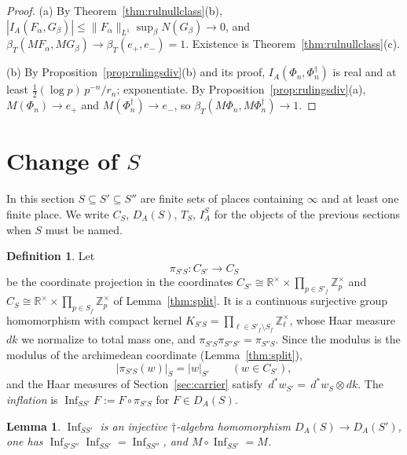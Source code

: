 \documentclass[11pt]{amsart}
\newtheorem{lemma}[theorem]{Lemma}
\theoremstyle{definition}
\newtheorem{definition}[theorem]{Definition}
\theoremstyle{remark}
\newcommand{\R}{\mathbb R}
\newcommand{\Z}{\mathbb Z}
\newcommand{\dstar}{\,d^{*}}
\newcommand{\Inf}{\operatorname{Inf}}
\newcommand{\DA}{D_A}
\begin{document}
\begin{proof}
(a)  By Theorem~\ref{thm:rulnullclass}(b),
$|I_A(F_{\alpha},G_{\beta})|\le\lVert F_{\alpha}\rVert_{L^{1}}
\sup_{\beta}N(G_{\beta})\to0$, and
$\beta_T(MF_{\alpha},MG_{\beta})\to\beta_T(e_+,e_-)=1$.  Existence is
Theorem~\ref{thm:rulnullclass}(c).

(b)  By Proposition~\ref{prop:rulingsdiv}(b) and its proof,
$I_A(\Phi_n,\Phi_n^{\dagger})$ is real and at least
$\tfrac12(\log p)\,p^{-n}/r_n$; exponentiate.  By
Proposition~\ref{prop:rulingsdiv}(a), $M(\Phi_n)\to e_+$ and
$M(\Phi_n^{\dagger})\to e_-$, so $\beta_T(M\Phi_n,M\Phi_n^{\dagger})\to1$.
\end{proof}

\section{Change of \texorpdfstring{$S$}{S}}\label{sec:charts}

In this section $S\subseteq S'\subseteq S''$ are finite sets of places
containing $\infty$ and at least one finite place.  We write $C_S$, $\DA(S)$,
$T_S$, $I_A^{S}$ for the objects of the previous sections when $S$ must be
named.

\begin{definition}\label{def:chartsystem}
Let
\begin{equation}\label{eq:piTS}
\pi_{S'S}:C_{S'}\longrightarrow C_S
\end{equation}
be the coordinate projection in the coordinates
$C_{S'}\cong\R^{\times}\times\prod_{p\in S'_f}\Z_p^{\times}$ and
$C_S\cong\R^{\times}\times\prod_{p\in S_f}\Z_p^{\times}$ of
Lemma~\ref{thm:split}.  It is a continuous surjective group homomorphism with
compact kernel $K_{S'S}=\prod_{\ell\in S'_f\setminus S_f}\Z_{\ell}^{\times}$,
whose Haar measure $dk$ we normalize to total mass one, and
$\pi_{S'S}\pi_{S''S'}=\pi_{S''S}$.  Since the modulus is the modulus of the
archimedean coordinate (Lemma~\ref{thm:split}),
\begin{equation}\label{eq:chartsystem}
|\pi_{S'S}(w)|_S=|w|_{S'}\qquad(w\in C_{S'}),
\end{equation}
and the Haar measures of Section~\ref{sec:carrier} satisfy
$\dstar w_{S'}=\dstar w_S\otimes dk$.  The \emph{inflation} is
$\Inf_{SS'}F:=F\circ\pi_{S'S}$ for $F\in\DA(S)$.
\end{definition}

\begin{lemma}\label{thm:chartsystem}
$\Inf_{SS'}$ is an injective $\dagger$-algebra homomorphism
$\DA(S)\to\DA(S')$, one has $\Inf_{S'S''}\Inf_{SS'}=\Inf_{SS''}$, and
$M\circ\Inf_{SS'}=M$.
\end{lemma}
\end{document}
